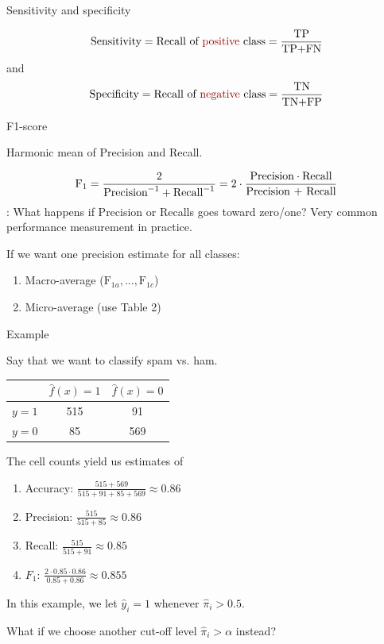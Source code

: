\documentclass[10pt]{beamer}
\begin{document}
\begin{frame}{Sensitivity and specificity}

\[
\text{Sensitivity} = \text{Recall of \uured{positive} class} =  \frac{\text{TP}}{\text{TP+FN}}
\]
and
\[
\text{Specificity} = \text{Recall of \uured{negative} class} =\frac{\text{TN}}{\text{TN+FP}}
\]

\end{frame}


\begin{frame}{F1-score}

Harmonic mean of Precision and Recall.

\[
\text{F}_1 = \frac{2}{\text{Precision}^{-1} + \text{Recall}^{-1}} = 2 \cdot \frac{\text{Precision} \cdot \text{Recall}}{\text{\text{Precision} + \text{Recall}}}
\]
: What happens if Precision or Recalls goes toward zero/one?
\pause
Very common performance measurement in practice.

If we want one precision estimate for all classes:
\begin{enumerate}
\item Macro-average ($\text{F}_{1a}, ..., \text{F}_{1c}$)
\item Micro-average (use Table 2)
\end{enumerate}

\end{frame}



\begin{frame}{Example}

Say that we want to classify spam vs. ham. \\[3mm]\pause

\begin{center}
\begin{tabular}{ l | c | c }
  & $\hat{f}(x)=1$ & $\hat{f}(x)=0$\\
  \hline
  $y=1$ & 515 & 91 \\
  $y=0$ & 85 & 569 \\
  \hline
\end{tabular}
\end{center}
The cell counts yield us estimates of
\begin{enumerate}
\item Accuracy: $\frac{515+569}{515+91+85+569}\approx 0.86$
\item Precision: $\frac{515}{515+85}\approx 0.86$
\item Recall: $\frac{515}{515+91}\approx 0.85$
\item $F_1$: $\frac{2 \cdot 0.85 \cdot 0.86}{0.85 + 0.86}\approx 0.855$
\end{enumerate}

\pause

In this example, we let $\hat{y}_i=1$ whenever $\hat{\pi}_i>0.5$.

What if we choose another cut-off level $\hat{\pi}_i>\alpha$ instead?

\end{frame}
\end{document}
